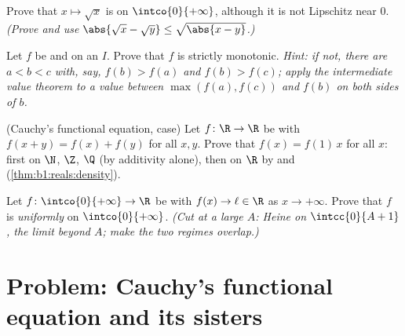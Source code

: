 \begin{exercise}[$\star\star$]\label{exo:b1:continuity:9}
Prove that $x \mapsto \sqrt x$ is  on
$\intco{0}{+\infty}$, although it is not Lipschitz near $0$.
\emph{(Prove and use $\abs{\sqrt x - \sqrt y} \leq \sqrt{\abs{x -
y}}$.)}
\end{exercise}

\begin{exercise}[$\star\star\star$]\label{exo:b1:continuity:10}
Let $f$ be  and  on an  $I$. Prove that
$f$ is strictly monotonic. \emph{Hint: if not, there are $a < b < c$
with, say, $f(b) > f(a)$ and $f(b) > f(c)$; apply the intermediate
value theorem to a value between $\max(f(a), f(c))$ and $f(b)$ on
both sides of $b$.}
\end{exercise}

\begin{exercise}[$\star\star\star$]\label{exo:b1:continuity:11}
(Cauchy's functional equation,  case) Let $f \colon \R \to
\R$ be  with $f(x + y) = f(x) + f(y)$ for all $x, y$.
Prove that $f(x) = f(1)\,x$ for all $x$: first on $\N$, $\Z$, $\Q$
(by additivity alone), then on $\R$ by  and 
(\cref{thm:b1:reals:density}).
\end{exercise}

\begin{exercise}[$\star\star\star$]\label{exo:b1:continuity:12}
Let $f \colon \intco{0}{+\infty} \to \R$ be  with
$f(x) \to \ell \in \R$ as $x \to +\infty$. Prove that $f$ is
\emph{uniformly}  on $\intco{0}{+\infty}$. \emph{(Cut at a
large $A$: Heine on $\intcc{0}{A+1}$, the limit beyond $A$; make the
two regimes overlap.)}
\end{exercise}

\section{Problem: Cauchy's functional equation and its sisters}

